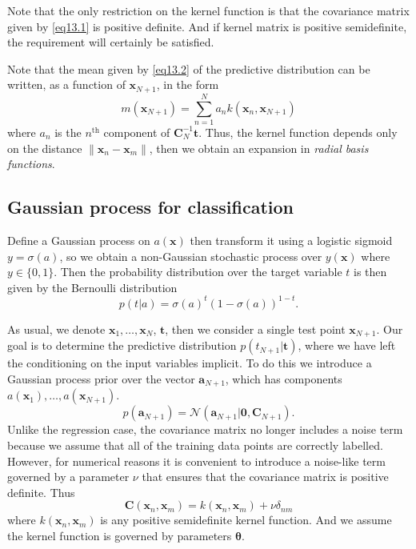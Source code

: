 \documentclass{article}
\newcommand{\normD}{\mathcal{N}}
\newcommand{\mrm}{\mathrm}
\newcommand{\mbf}{\mathbf}
\newcommand{\CC}{\mbf C}
\newcommand{\ttt}{\mbf t}
\newcommand{\xx}{\mbf x}
\newcommand{\bmz}{\bm{0}}
\newcommand{\rev}{^{-1}}
\begin{document}
Note that the only restriction on the kernel function is that the covariance matrix given by  \ref{eq13.1} is positive definite. And if kernel matrix is positive semidefinite, the requirement will certainly be satisfied.  

Note that the mean given by \ref{eq13.2} of the predictive distribution can be written, as a function of $\xx_{N+1}$, in the form
\begin{equation}
    m(\xx_{N+1})=\sum_{n=1}^Na_nk(\xx_n, \xx_{N+1})
\end{equation}
where $a_n$ is the $n^{\mrm{th}}$ component of $\CC_N\rev\ttt$. Thus, the kernel function depends only on the distance $\|\xx_n-\xx_m\|$, then we obtain an expansion in \emph{radial basis functions}.

\subsection{Gaussian process for classification}
Define a Gaussian process on $a(\xx)$ then transform it using a logistic sigmoid $y=\sigma(a)$, so we obtain a non-Gaussian stochastic process over $y(\xx)$ where $y\in\{0,1\}$. Then the probability distribution over the target variable $t$ is then given by the Bernoulli distribution 
\begin{equation}
    p(t|a)=\sigma(a)^t(1-\sigma(a))^{1-t}.
\end{equation}

As usual, we denote $\xx_1,\dots,\xx_N$, $\ttt$, then we consider a single test point $\xx_{N+1}$. Our goal is to determine the predictive distribution $p(t_{N+1}|\ttt)$, where we have left the conditioning on the input variables implicit. To do this we introduce a Gaussian process 
prior over the vector $\mbf a_{N+1}$, which has components $a(\xx_1), \dots, a(\xx_{N+1})$. 
\begin{equation}
    p(\mbf a_{N+1}) = \normD(\mbf a_{N+1}|\bmz,\CC_{N+1}).
\end{equation}
Unlike the regression case, the covariance matrix no longer includes a noise term because we assume that all of the training data points are correctly labelled. However, for numerical reasons it is convenient to introduce a noise-like term governed by a parameter $\nu$ that ensures that the covariance matrix is positive definite. Thus 
\begin{equation}
    \CC(\xx_n,\xx_m) = k(\xx_n,\xx_m)+\nu\delta_{nm}
\end{equation}
where $k(\xx_n,\xx_m)$ is any positive semidefinite kernel function. And we assume the kernel function is governed by parameters $\bm{\theta}$. 
\end{document}
